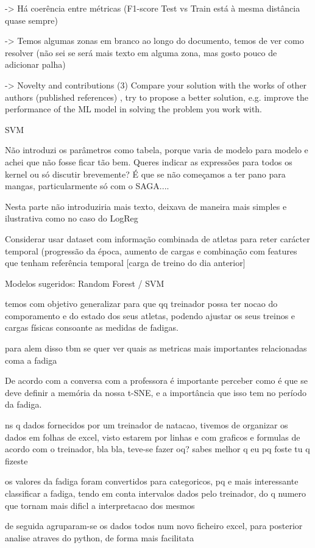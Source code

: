 \documentclass[conference]{IEEEtran}
\begin{document}
-> Há coerência entre métricas (F1-score Test vs Train está à mesma distância quase sempre)


-> Temos algumas zonas em branco ao longo do documento, temos de ver como resolver (não sei se será mais texto em alguma zona, mas gosto pouco de adicionar palha)


-> Novelty and contributions (3) Compare your solution with the works of other authors (published references) , try to propose a better solution, e.g. improve the performance of the ML model in solving the problem you work with.

SVM

Não introduzi os parâmetros como tabela, porque varia de modelo para modelo e achei que não fosse ficar tão bem. Queres indicar as expressões para todos os kernel ou só discutir brevemente? É que se não começamos a ter pano para mangas, particularmente só com o SAGA....

Nesta parte não introduziria mais texto, deixava de maneira mais simples e ilustrativa como no caso do LogReg


Considerar usar dataset com informação combinada de atletas para reter carácter temporal (progressão da época, aumento de cargas e combinação com features que tenham referência temporal [carga de treino do dia anterior]

Modelos sugeridos: Random Forest / SVM

temos com objetivo generalizar para que qq treinador possa ter nocao do comporamento e do estado dos seus atletas, podendo ajustar os seus treinos e cargas físicas consoante as medidas de fadigas.

para alem disso tbm se quer ver quais as metricas mais importantes relacionadas coma a fadiga

De acordo com a conversa com a professora é importante perceber como é que se deve definir a memória da nossa t-SNE, e a importância que isso tem no período da fadiga.

ns q dados fornecidos por um treinador de natacao, tivemos de organizar os dados em folhas de excel, visto estarem por linhas e com graficos e formulas de acordo com o treinador, bla bla, teve-se fazer oq? sabes melhor q eu pq foste tu q fizeste

os valores da fadiga foram convertidos para categoricos, pq e mais interessante classificar a fadiga, tendo em conta intervalos dados pelo treinador, do q numero que tornam mais dificl a interpretacao dos mesmos

de seguida agruparam-se os dados todos num novo ficheiro excel, para posterior analise atraves do python, de forma mais facilitata
\end{document}
